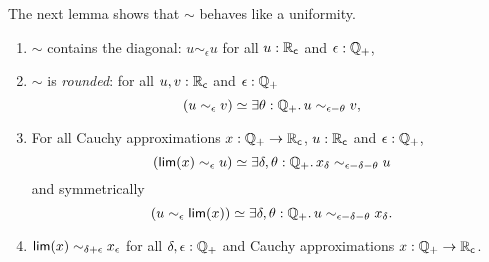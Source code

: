 The next lemma shows that $\sim$ behaves like a uniformity.

\begin{lem}\label{RC-sim-uniformity-properties}
  \mbox{}
  \begin{enumerate}

  \item \label{RC-sim-diagonal}
    $\sim$ contains the diagonal:
    $u \sim_\epsilon u$ for all $u : \mathbb{R}_\mathsf{c}$ and $\epsilon : \mathbb{Q}_{+}$,

  \item \label{RC-sim-rounded}
    $\sim$ is \emph{rounded}:
    for all $u, v : \mathbb{R}_\mathsf{c}$ and $\epsilon : \mathbb{Q}_{+}$
    \begin{equation*}
      \eqv{
        (u \sim_\epsilon v)
      }{
        \exis{\theta : \Qp} u \sim_{\epsilon - \theta} v
      },
    \end{equation*}

  \item \label{RC-sim-lim-rounded}
    For all Cauchy approximations $x : \mathbb{Q}_{+} \to \mathbb{R}_\mathsf{c}$, $u : \mathbb{R}_\mathsf{c}$ and $\epsilon : \mathbb{Q}_{+}$,
    \begin{equation} \label{eq:RC-sim-lim-rounded-i}
      \eqv{
        (\rclim(x) \sim_\epsilon u)
      }{
        \exis{\delta, \theta : \Qp} x_\delta \sim_{\epsilon - \delta - \theta} u
      }
    \end{equation}
    and symmetrically
    \begin{equation} \label{eq:RC-sim-lim-rounded-ii}
      \eqv{
        (u \sim_\epsilon \rclim(x))
      }{
        \exis{\delta, \theta : \Qp} u \sim_{\epsilon - \delta - \theta} x_\delta
      }.
    \end{equation}

  \item \label{RC-sim-self}
    $\mathsf{lim}(x) \sim_{\delta + \epsilon} x_\epsilon$ for all $\delta, \epsilon : \mathbb{Q}_{+}$
    and Cauchy approximations $x : \mathbb{Q}_{+} \to \mathbb{R}_\mathsf{c}$.

  \end{enumerate}
\end{lem}

